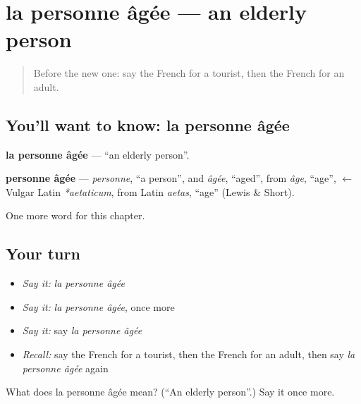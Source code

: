 \section[la personne âgée]{la personne âgée — an elderly person}

\label{lesson:FR-C250-personne-agee}



\begin{quote}
Before the new one: say the French for a tourist, then the French for an adult.
\end{quote}

\subsection*{You'll want to know: la personne âgée}
\textbf{la personne âgée} — \textquotedblleft{}an elderly person\textquotedblright{}.

\begin{cousinweb}
\textbf{personne âgée} — \emph{personne}, \textquotedblleft{}a person\textquotedblright{}, and \emph{âgée}, \textquotedblleft{}aged\textquotedblright{}, from \emph{âge}, \textquotedblleft{}age\textquotedblright{}, $\leftarrow$ Vulgar Latin \emph{*aetaticum}, from Latin \emph{aetas}, \textquotedblleft{}age\textquotedblright{} (Lewis \& Short).
\end{cousinweb}

\begin{grammarlens}[title={What you've built}]
One more word for this chapter.
\end{grammarlens}

\subsection*{Your turn}
\begin{itemize}
\raggedright
  \item \emph{Say it:} \emph{la personne âgée}
  \item \emph{Say it:} \emph{la personne âgée}, once more
  \item \emph{Say it:} say \emph{la personne âgée}
  \item \emph{Recall:} say the French for a tourist, then the French for an adult, then say \emph{la personne âgée} again
\end{itemize}

\begin{tcolorbox}[breakable,colback=teal!4,colframe=teal!35!black,title={Before you move on}]
What does la personne âgée mean? (\textquotedblleft{}An elderly person\textquotedblright{}.) Say it once more.
\end{tcolorbox}

